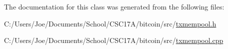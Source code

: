The documentation for this class was generated from the following files\+:\begin{DoxyCompactItemize}
\item 
C\+:/\+Users/\+Joe/\+Documents/\+School/\+C\+S\+C17\+A/bitcoin/src/\hyperlink{txmempool_8h}{txmempool.\+h}\item 
C\+:/\+Users/\+Joe/\+Documents/\+School/\+C\+S\+C17\+A/bitcoin/src/\hyperlink{txmempool_8cpp}{txmempool.\+cpp}\end{DoxyCompactItemize}
